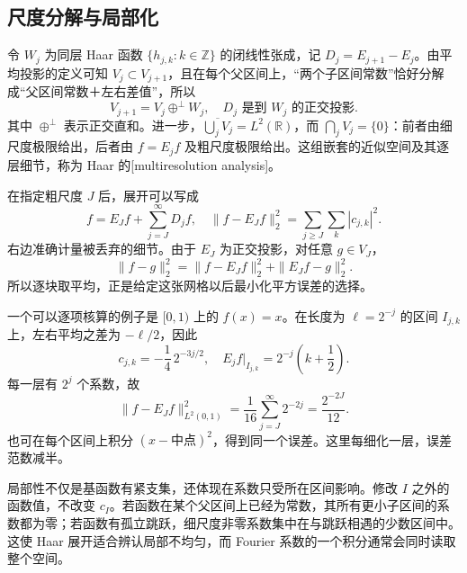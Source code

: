 \subsection{尺度分解与局部化}
\label{b2:subsec:190603}

令 \(W_j\) 为同层 Haar 函数 \(\{h_{j,k}:k\in\mathbb Z\}\) 的闭线性张成，记
\(D_j=E_{j+1}-E_j\)。由平均投影的定义可知
\(V_j\subset V_{j+1}\)，且在每个父区间上，“两个子区间常数”恰好分解成“父区间常数＋左右差值”，所以
\begin{equation}\label{b2:eq:19-haar-multiresolution}
 V_{j+1}=V_j\mathbin{\oplus^\perp}W_j,
 \quad D_j\text{ 是到 }W_j\text{ 的正交投影}.
\end{equation}
其中 \(\oplus^\perp\) 表示正交直和。进一步，\(\overline{\bigcup_jV_j}=L^2(\mathbb R)\)，而 \(\bigcap_jV_j=\{0\}\)：前者由细尺度极限给出，后者由 \(f=E_jf\) 及粗尺度极限给出。这组嵌套的近似空间及其逐层细节，称为 Haar 的[multiresolution analysis]。

在指定粗尺度 \(J\) 后，展开可以写成
\begin{equation}\label{b2:eq:19-haar-inhomogeneous}
 f=E_Jf+\sum_{j=J}^\infty D_jf,
 \quad
 \|f-E_Jf\|_2^2=\sum_{j\geq J}\sum_k|c_{j,k}|^2.
\end{equation}
右边准确计量被丢弃的细节。由于 \(E_J\) 为正交投影，对任意 \(g\in V_J\)，
\[
 \|f-g\|_2^2=\|f-E_Jf\|_2^2+\|E_Jf-g\|_2^2.
\]
所以逐块取平均，正是给定这张网格以后最小化平方误差的选择。

一个可以逐项核算的例子是 \([0,1)\) 上的 \(f(x)=x\)。在长度为 \(\ell=2^{-j}\) 的区间 \(I_{j,k}\) 上，左右平均之差为 \(-\ell/2\)，因此
\[
 c_{j,k}=-\frac14\,2^{-3j/2},
 \quad E_jf\big|_{I_{j,k}}=2^{-j}\left(k+\frac12\right).
\]
每一层有 \(2^j\) 个系数，故
\[
 \|f-E_Jf\|_{L^2(0,1)}^2
 =\frac1{16}\sum_{j=J}^\infty2^{-2j}
 =\frac{2^{-2J}}{12}.
\]
也可在每个区间上积分 \((x-\text{中点})^2\)，得到同一个误差。这里每细化一层，误差范数减半。

局部性不仅是基函数有紧支集，还体现在系数只受所在区间影响。修改 \(I\) 之外的函数值，不改变 \(c_I\)。若函数在某个父区间上已经为常数，其所有更小子区间的系数都为零；若函数有孤立跳跃，细尺度非零系数集中在与跳跃相遇的少数区间中。这使 Haar 展开适合辨认局部不均匀，而 Fourier 系数的一个积分通常会同时读取整个空间。

